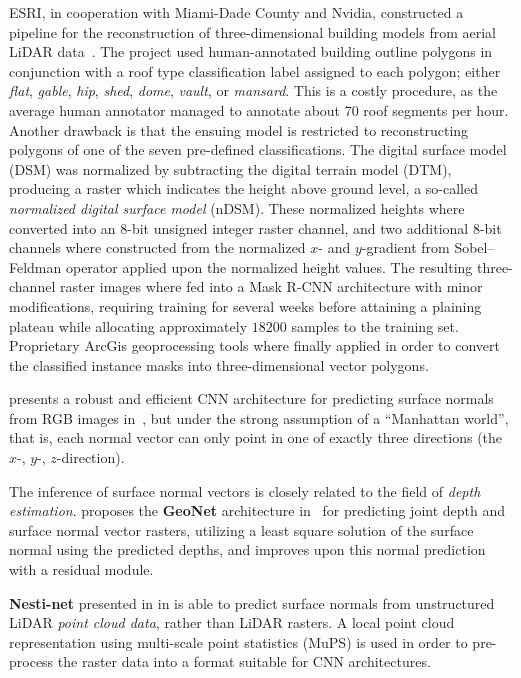 ESRI, in cooperation with Miami-Dade County and Nvidia, constructed a pipeline for the reconstruction of three-dimensional building models from aerial LiDAR data~\cite{esri-reconstruction}.
The project used human-annotated building outline polygons in conjunction with a roof type classification label assigned to each polygon; either \textit{flat}, \textit{gable}, \textit{hip}, \textit{shed}, \textit{dome}, \textit{vault}, or \textit{mansard}.
This is a costly procedure, as the average human annotator managed to annotate about 70 roof segments per hour.
Another drawback is that the ensuing model is restricted to reconstructing polygons of one of the seven pre-defined classifications.
The digital surface model (DSM) was normalized by subtracting the digital terrain model (DTM), producing a raster which indicates the height above ground level, a so-called \textit{normalized digital surface model} (nDSM).
These normalized heights where converted into an 8-bit unsigned integer raster channel, and two additional 8-bit channels where constructed from the normalized $x$- and $y$-gradient from Sobel–Feldman operator applied upon the normalized height values.
The resulting three-channel raster images where fed into a Mask R-CNN architecture with minor modifications, requiring training for several weeks before attaining a plaining plateau while allocating approximately $\num{18200}$ samples to the training set.
Proprietary ArcGis geoprocessing tools where finally applied in order to convert the classified instance masks into three-dimensional vector polygons.

\citeauthor{surface-normal-estimation} presents a robust and efficient CNN architecture for predicting surface normals from RGB images in~\cite{surface-normal-estimation}, but under the strong assumption of a \enquote{Manhattan world}, that is, each normal vector can only point in one of exactly three directions (the $x$-, $y$-, $z$-direction).

The inference of surface normal vectors is closely related to the field of \textit{depth estimation}.
\citeauthor{geonet} proposes the \textbf{GeoNet} architecture in~\cite{geonet} for predicting joint depth and surface normal vector rasters, utilizing a least square solution of the surface normal using the predicted depths, and improves upon this normal prediction with a residual module.

\textbf{Nesti-net} presented in \cite{nestinet} in \citeyear{nestinet} is able to predict surface normals from unstructured LiDAR \emph{point cloud data}, rather than LiDAR rasters.
A local point cloud representation using multi-scale point statistics (MuPS) is used in order to pre-process the raster data into a format suitable for CNN architectures.
